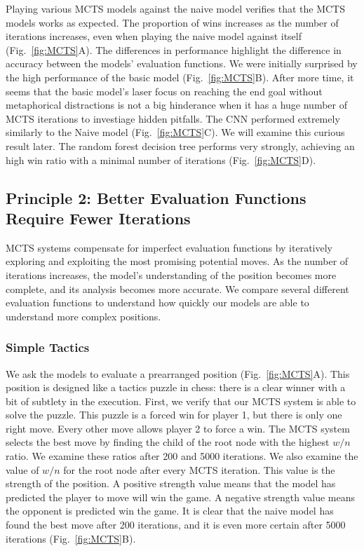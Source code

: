 \documentclass[10pt]{article}
\begin{document}
Playing various MCTS models against the naive model verifies that the MCTS models works as expected. The proportion of wins increases as the number of iterations increases, even when playing the naive model against itself (Fig.~\ref{fig:MCTS}A). The differences in performance highlight the difference in accuracy between the models' evaluation functions. We were initially surprised by the high performance of the basic model (Fig.~\ref{fig:MCTS}B). After more time, it seems that the basic model's laser focus on reaching the end goal without metaphorical distractions is not a big hinderance when it has a huge number of MCTS iterations to investiage hidden pitfalls. The CNN performed extremely similarly to the Naive model (Fig.~\ref{fig:MCTS}C). We will examine this curious result later. The random forest decision tree performs very strongly, achieving an high win ratio with a minimal number of iterations (Fig.~\ref{fig:MCTS}D). 

\subsection{Principle 2: Better Evaluation Functions Require Fewer Iterations}

MCTS systems compensate for imperfect evaluation functions by iteratively exploring and exploiting the most promising potential moves. As the number of iterations increases, the model's understanding of the position becomes more complete, and its analysis becomes more accurate. We compare several different evaluation functions to understand how quickly our models are able to understand more complex positions.


\subsubsection{Simple Tactics}
We ask the models to evaluate a prearranged position (Fig.~\ref{fig:MCTS}A). This position is designed like a tactics puzzle in chess: there is a clear winner with a bit of subtlety in the execution. First, we verify that our MCTS system is able to solve the puzzle. This puzzle is a forced win for player 1, but there is only one right move. Every other move allows player 2 to force a win. The MCTS system selects the best move by finding the child of the root node with the highest $w / n$ ratio. We examine these ratios after 200 and 5000 iterations. We also examine the value of $w / n$ for the root node after every MCTS iteration. This value is the strength of the position. A positive strength value means that the model has predicted the player to move will win the game. A negative strength value means the opponent is predicted win the game. It is clear that the naive model has found the best move after 200 iterations, and it is even more certain after 5000 iterations (Fig.~\ref{fig:MCTS}B).
\end{document}
